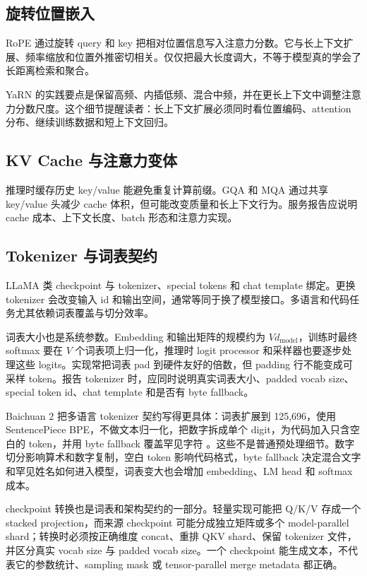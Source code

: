 \documentclass[UTF8,zihao=-4,openany]{ctexbook}
\begin{document}
\subsection{旋转位置嵌入}
RoPE 通过旋转 query 和 key 把相对位置信息写入注意力分数。它与长上下文扩展、频率缩放和位置外推密切相关。仅仅把最大长度调大，不等于模型真的学会了长距离检索和聚合。

YaRN 的实践要点是保留高频、内插低频、混合中频，并在更长上下文中调整注意力分数尺度。这个细节提醒读者：长上下文扩展必须同时看位置编码、attention 分布、继续训练数据和短上下文回归。

\subsection{KV Cache 与注意力变体}
推理时缓存历史 key/value 能避免重复计算前缀。GQA 和 MQA 通过共享 key/value 头减少 cache 体积，但可能改变质量和长上下文行为。服务报告应说明 cache 成本、上下文长度、batch 形态和注意力实现。

\subsection{Tokenizer 与词表契约}
LLaMA 类 checkpoint 与 tokenizer、special tokens 和 chat template 绑定。更换 tokenizer 会改变输入 id 和输出空间，通常等同于换了模型接口。多语言和代码任务尤其依赖词表覆盖与切分效率。

词表大小也是系统参数。Embedding 和输出矩阵的规模约为 $Vd_{\mathrm{model}}$，训练时最终 softmax 要在 $V$ 个词表项上归一化，推理时 logit processor 和采样器也要逐步处理这些 logits。实现常把词表 pad 到硬件友好的倍数，但 padding 行不能变成可采样 token。报告 tokenizer 时，应同时说明真实词表大小、padded vocab size、special token id、chat template 和是否有 byte fallback。

Baichuan 2 把多语言 tokenizer 契约写得更具体：词表扩展到 125,696，使用 SentencePiece BPE，不做文本归一化，把数字拆成单个 digit，为代码加入只含空白的 token，并用 byte fallback 覆盖罕见字符 \cite{yang2023baichuan2}。这些不是普通预处理细节。数字切分影响算术和数字复制，空白 token 影响代码格式，byte fallback 决定混合文字和罕见姓名如何进入模型，词表变大也会增加 embedding、LM head 和 softmax 成本。

checkpoint 转换也是词表和架构契约的一部分。轻量实现可能把 Q/K/V 存成一个 stacked projection，而来源 checkpoint 可能分成独立矩阵或多个 model-parallel shard；转换时必须按正确维度 concat、重排 QKV shard、保留 tokenizer 文件，并区分真实 vocab size 与 padded vocab size。一个 checkpoint 能生成文本，不代表它的参数统计、sampling mask 或 tensor-parallel merge metadata 都正确。
\end{document}
